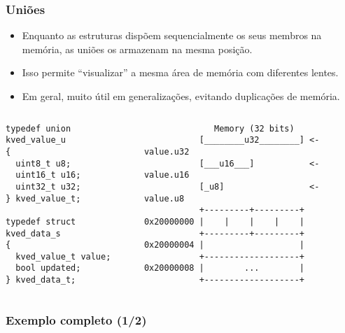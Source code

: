 \documentclass{beamer}
\begin{document}
\begin{frame}[fragile]
	\frametitle{Uniões}
	\begin{itemize}
	\item Enquanto as estruturas dispõem sequencialmente os seus membros na memória, as uniões os armazenam na mesma posição.
	\item Isso permite ``visualizar'' a mesma área de memória com diferentes lentes.
	\item Em geral, muito útil em generalizações, evitando duplicações de memória.
	\end{itemize}
	\begin{columns}[T] %
		\begin{column}{.5\textwidth}
	\begin{lstlisting}[style=customc]
typedef union kved_value_u
{
  uint8_t u8;
  uint16_t u16;
  uint32_t u32;
} kved_value_t;

typedef struct kved_data_s
{
  kved_value_t value;
  bool updated;
} kved_data_t;
	\end{lstlisting}
		\end{column}%
		\hfill%
		\begin{column}{.5\textwidth}
        {\tiny
	\begin{verbatim}
              Memory (32 bits)
           [________u32________] <- value.u32
           [___u16___]           <- value.u16
           [_u8]                 <- value.u8
           +---------+---------+
0x20000000 |    |    |    |    |
           +---------+---------+
0x20000004 |                   |
           +-------------------+
0x20000008 |        ...        |
           +-------------------+
	\end{verbatim}
    }
		\end{column}%
	\end{columns}
\end{frame}

\begin{frame}
	\frametitle{Exemplo completo (1/2)}
	\begin{columns}[T] %
		\begin{column}{.5\textwidth}
		
			\end{column}%
		\hfill%
		\begin{column}{.5\textwidth}
		
		\end{column}%
	\end{columns}
\end{frame}
\end{document}
